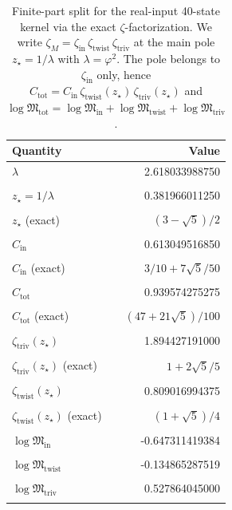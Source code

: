\begin{table}[H]
\centering
\scriptsize
\setlength{\tabcolsep}{6pt}
\caption{Finite-part split for the real-input 40-state kernel via the exact $\zeta$-factorization. We write $\zeta_M=\zeta_{\mathrm{in}}\,\zeta_{\mathrm{twist}}\,\zeta_{\mathrm{triv}}$ at the main pole $z_\star=1/\lambda$ with $\lambda=\varphi^2$. The pole belongs to $\zeta_{\mathrm{in}}$ only, hence $C_{\mathrm{tot}}=C_{\mathrm{in}}\,\zeta_{\mathrm{twist}}(z_\star)\,\zeta_{\mathrm{triv}}(z_\star)$ and $\log\mathfrak{M}_{\mathrm{tot}}=\log\mathfrak{M}_{\mathrm{in}}+\log\mathfrak{M}_{\mathrm{twist}}+\log\mathfrak{M}_{\mathrm{triv}}$.}
\label{tab:real_input_40_finite_part_split}
\begin{tabular}{l r}
\toprule
Quantity & Value\\
\midrule
$\lambda$ & 2.618033988750\\\\
$z_\star=1/\lambda$ & 0.381966011250\\\\
$z_\star$ (exact) & $(3-\sqrt{5})/2$\\\\
$C_{\mathrm{in}}$ & 0.613049516850\\\\
$C_{\mathrm{in}}$ (exact) & $3/10+7\sqrt{5}/50$\\\\
$C_{\mathrm{tot}}$ & 0.939574275275\\\\
$C_{\mathrm{tot}}$ (exact) & $(47+21\sqrt{5})/100$\\\\
$\zeta_{\mathrm{triv}}(z_\star)$ & 1.894427191000\\\\
$\zeta_{\mathrm{triv}}(z_\star)$ (exact) & $1+2\sqrt{5}/5$\\\\
$\zeta_{\mathrm{twist}}(z_\star)$ & 0.809016994375\\\\
$\zeta_{\mathrm{twist}}(z_\star)$ (exact) & $(1+\sqrt{5})/4$\\\\
$\log\mathfrak{M}_{\mathrm{in}}$ & -0.647311419384\\\\
$\log\mathfrak{M}_{\mathrm{twist}}$ & -0.134865287519\\\\
$\log\mathfrak{M}_{\mathrm{triv}}$ & 0.527864045000\\\\

\end{tabular}
\end{table}
